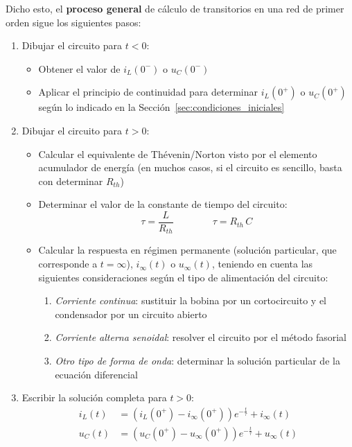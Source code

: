 Dicho esto, el \textbf{proceso general} de cálculo de transitorios en
una red de primer orden sigue los siguientes pasos:
\begin{enumerate}
\item Dibujar el circuito para $t < 0$:
  \begin{itemize}
  \item Obtener el valor de $i_L(0^-)$ o $u_C(0^-)$
  \item Aplicar el principio de continuidad para determinar $i_L(0^+)$
    o $u_C(0^+)$ según lo indicado en la
    Sección~\ref{sec:condiciones_iniciales}
  \end{itemize}
\item Dibujar el circuito para \(t > 0\):
  \begin{itemize}
  \item Calcular el equivalente de Thévenin/Norton visto por el
    elemento acumulador de energía (en muchos casos, si el circuito es
    sencillo, basta con determinar $R_{th}$)
  \item Determinar el valor de la constante de tiempo del circuito:
    \begin{equation*}
      \tau = \dfrac{L}{R_{th}} \qquad\qquad \tau = R_{th}\,{C}
    \end{equation*}
  \item Calcular la respuesta en régimen permanente (solución
    particular, que corresponde a $t=\infty$), $i_\infty(t)$ o
    $u_\infty(t)$, teniendo en cuenta las siguientes consideraciones
    según el tipo de alimentación del circuito:
    \begin{enumerate}
    \item \textit{Corriente continua}: sustituir la bobina por un
      cortocircuito y el condensador por un circuito abierto
    \item \textit{Corriente alterna senoidal}: resolver el circuito
      por el método fasorial
    \item \textit{Otro tipo de forma de onda}: determinar la solución
      particular de la ecuación diferencial
    \end{enumerate}
  \end{itemize}
\item Escribir la solución completa para $t>0$:
  \begin{align*}
    i_L(t) &= \left(i_L(0^+) - i_\infty(0^+)\right) e^{-\frac{t}{\tau}} + i_\infty(t)\\
    u_C(t) &= \left(u_C(0^+) - u_\infty(0^+)\right) e^{-\frac{t}{\tau}} + u_\infty(t)\\
  \end{align*}
\end{enumerate}
	

